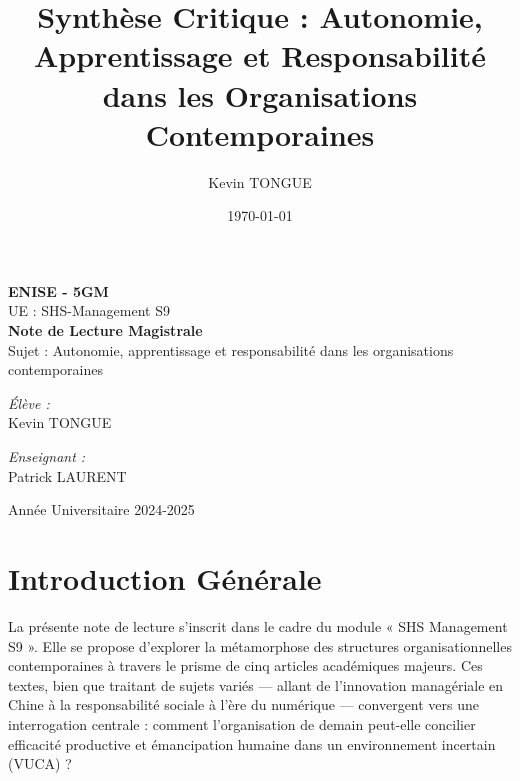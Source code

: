 \documentclass[12pt,a4paper]{report}
\title{Synthèse Critique : Autonomie, Apprentissage et Responsabilité dans les Organisations Contemporaines}
\author{Kevin \textsc{TONGUE}}
\date{\today}
\begin{document}
\begin{titlepage}
    \centering
    \vspace*{1cm}
    {\Large \textbf{ENISE - 5GM}} \\
    \vspace{0.5cm}
    {\large UE : SHS-Management S9} \\
    \hr
    \vspace{2cm}
    {\huge \textbf{Note de Lecture Magistrale}} \\
    \vspace{1cm}
    {\Large Sujet : Autonomie, apprentissage et responsabilité dans les organisations contemporaines} \\
    \vspace{2cm}
    \begin{minipage}{0.4\textwidth}
        \begin{flushleft} \large
            \emph{Élève :}\\
            Kevin \textsc{TONGUE}
        \end{flushleft}
    \end{minipage}
    \begin{minipage}{0.4\textwidth}
        \begin{flushright} \large
            \emph{Enseignant :} \\
            Patrick \textsc{LAURENT}
        \end{flushright}
    \end{minipage}
    \vfill
    {\large Année Universitaire 2024-2025}
\end{titlepage}

\tableofcontents
\newpage

\section*{Introduction Générale}
La présente note de lecture s'inscrit dans le cadre du module « SHS Management S9 ». Elle se propose d'explorer la métamorphose des structures organisationnelles contemporaines à travers le prisme de cinq articles académiques majeurs. Ces textes, bien que traitant de sujets variés — allant de l'innovation managériale en Chine à la responsabilité sociale à l'ère du numérique — convergent vers une interrogation centrale : comment l'organisation de demain peut-elle concilier efficacité productive et émancipation humaine dans un environnement incertain (VUCA) ?
\end{document}
